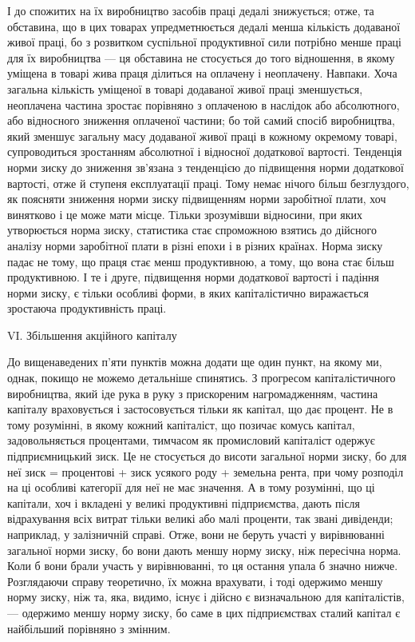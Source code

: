 \parcont{}  %
І до спожитих на їх виробництво засобів праці дедалі знижується; отже, та обставина, що в цих
товарах упредметнюється дедалі менша кількість додаваної живої праці, бо з розвитком суспільної
продуктивної сили потрібно менше праці для їх виробництва — ця обставина не стосується до того
відношення, в якому уміщена в товарі жива праця ділиться на оплачену і неоплачену. Навпаки. Хоча
загальна кількість уміщеної в товарі додаваної живої праці зменшується, неоплачена частина зростає
порівняно з оплаченою в наслідок або абсолютного, або відносного зниження оплаченої частини; бо той
самий спосіб виробництва, який зменшує загальну масу додаваної живої праці в кожному окремому
товарі, супроводиться зростанням абсолютної і відносної додаткової вартості. Тенденція норми зиску
до зниження зв’язана з тенденцією до підвищення норми додаткової вартості, отже й ступеня
експлуатації праці. Тому немає нічого більш безглуздого, як поясняти зниження норми зиску
підвищенням норми заробітної плати, хоч винятково і це може мати місце. Тільки зрозумівши відносини,
при яких утворюється норма зиску, статистика стає спроможною взятись до дійсного аналізу норми
заробітної плати в різні епохи і в різних країнах. Норма зиску падає не тому, що праця стає менш
продуктивною, а тому, що вона стає більш продуктивною. І те і друге, підвищення норми додаткової
вартості і падіння норми зиску, є тільки особливі форми, в яких капіталістично виражається зростаюча
продуктивність праці.

VI. Збільшення акційного капіталу

До вищенаведених п’яти пунктів можна додати ще один пункт, на якому ми, однак, покищо не можемо
детальніше спинятись. З прогресом капіталістичного виробництва, який іде рука в руку з прискореним
нагромадженням, частина капіталу враховується і застосовується тільки як капітал, що дає процент. Не
в тому розумінні, в якому кожний капіталіст, що позичає комусь капітал, задовольняється процентами,
тимчасом як промисловий капіталіст одержує підприємницький зиск. Це не стосується до висоти
загальної норми зиску, бо для неї зиск = процентові + зиск усякого роду + земельна рента, при чому
розподіл на ці особливі категорії для неї не має значення. А в тому
розумінні, що ці капітали, хоч і вкладені у великі продуктивні підприємства, дають після
відрахування всіх витрат тільки великі або малі проценти, так звані дивіденди; наприклад, у
залізничній справі. Отже, вони не беруть участі у вирівнюванні загальної норми зиску, бо вони дають
меншу норму зиску, ніж пересічна норма. Коли б вони брали участь у вирівнюванні, то ця остання упала
б значно нижче. Розглядаючи справу теоретично, їх можна врахувати, і тоді одержимо меншу норму
зиску, ніж та, яка, видимо, існує і дійсно є визначальною для капіталістів, — одержимо меншу норму
зиску, бо саме в цих підприємствах сталий капітал є найбільший порівняно з змінним.
